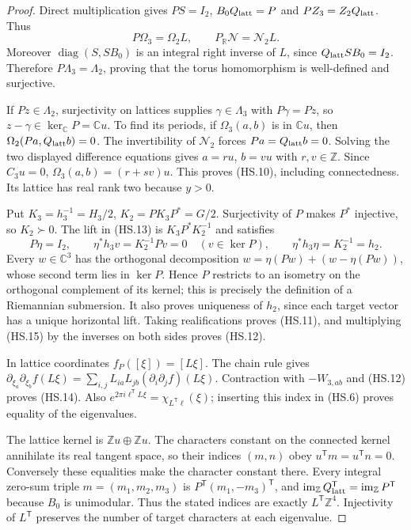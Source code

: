 \begin{proof}
Direct multiplication gives $PS=I_2$, $B_0Q_{\rm latt}=P$ and
$PZ_3=Z_2Q_{\rm latt}$. Thus
\[
 P\Omega_3=\Omega_2L,\qquad
 P_{\mathbb R}\mathcal N=\mathcal N_2L.                        \tag{HS.15}
\]
Moreover $\operatorname{diag}(S,SB_0)$ is an integral right inverse
of $L$, since $Q_{\rm latt}SB_0=I_2$. Therefore
$P\Lambda_3=\Lambda_2$, proving that the torus homomorphism is
well-defined and surjective.

If $Pz\in\Lambda_2$, surjectivity on lattices supplies
$\gamma\in\Lambda_3$ with $P\gamma=Pz$, so $z-\gamma\in\ker_{\mathbb C}P
=\mathbb C u$. To find its periods, if $\Omega_3(a,b)$ is in
$\mathbb C u$, then $\Omega_2(Pa,Q_{\rm latt}b)=0$.
The invertibility of $\mathcal N_2$ forces $Pa=Q_{\rm latt}b=0$.
Solving the two displayed difference equations gives
$a=ru$, $b=vu$ with $r,v\in\mathbb Z$. Since $C_3u=0$,
$\Omega_3(a,b)=(r+sv)u$. This proves (HS.10), including connectedness.
Its lattice has real rank two because $y>0$.

Put $K_3=h_3^{-1}=H_3/2$, $K_2=PK_3P^*=G/2$.
Surjectivity of $P$ makes $P^*$ injective, so $K_2\succ0$.
The lift in (HS.13) is $K_3P^*K_2^{-1}$ and satisfies
\[
 P\eta=I_2,\qquad
 \eta^*h_3 v=K_2^{-1}Pv=0\quad(v\in\ker P),\qquad
 \eta^*h_3\eta=K_2^{-1}=h_2.                                \tag{HS.16}
\]
Every $w\in\mathbb C^3$ has the orthogonal decomposition
$w=\eta(Pw)+(w-\eta(Pw))$, whose second term lies in $\ker P$.
Hence $P$ restricts to an isometry on the orthogonal complement of
its kernel; this is precisely the definition of a Riemannian
submersion. It also proves uniqueness of $h_2$, since each target
vector has a unique horizontal lift. Taking realifications proves
(HS.11), and multiplying (HS.15) by the inverses on both sides proves
(HS.12).

In lattice coordinates $f_P([\xi])=[L\xi]$. The chain rule gives
$\partial_{\xi_a}\partial_{\xi_b}f(L\xi)
=\sum_{i,j}L_{ia}L_{jb}(\partial_i\partial_jf)(L\xi)$.
Contraction with $-W_{3,ab}$ and (HS.12) proves (HS.14).
Also $e^{2\pi i\ell^{\mathsf T}L\xi}=\chi_{L^{\mathsf T}\ell}(\xi)$;
inserting this index in (HS.6) proves equality of the eigenvalues.

The lattice kernel is $\mathbb Z u\oplus\mathbb Z u$.
The characters constant on the connected kernel annihilate its real
tangent space, so their indices $(m,n)$ obey
$u^{\mathsf T}m=u^{\mathsf T}n=0$. Conversely these equalities make
the character constant there. Every integral zero-sum triple
$m=(m_1,m_2,m_3)$ is
$P^{\mathsf T}(m_1,-m_3)^{\mathsf T}$, and
$\operatorname{im}_{\mathbb Z}Q_{\rm latt}^{\mathsf T}
=\operatorname{im}_{\mathbb Z}P^{\mathsf T}$ because $B_0$ is
unimodular. Thus the stated indices are exactly
$L^{\mathsf T}\mathbb Z^4$. Injectivity of $L^{\mathsf T}$
preserves the number of target characters at each eigenvalue.
\end{proof}

